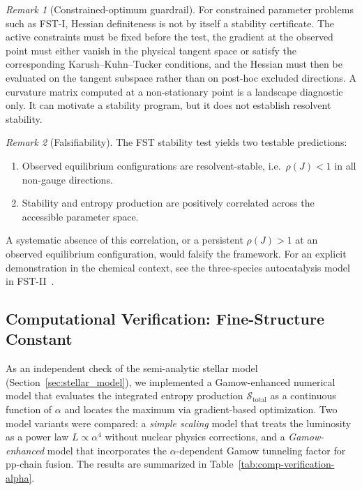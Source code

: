 \documentclass[12pt,a4paper]{article}
\theoremstyle{remark}
\newtheorem{remark}{Remark}
\begin{document}
\begin{remark}[Constrained-optimum guardrail]\label{rem:kkt-guardrail}
For constrained parameter problems such as FST-I, Hessian definiteness is not
by itself a stability certificate.  The active constraints must be fixed before
the test, the gradient at the observed point must either vanish in the physical
tangent space or satisfy the corresponding Karush--Kuhn--Tucker conditions, and
the Hessian must then be evaluated on the tangent subspace rather than on
post-hoc excluded directions.  A curvature matrix computed at a non-stationary
point is a landscape diagnostic only.  It can motivate a stability program, but
it does not establish resolvent stability.
\end{remark}

\begin{remark}[Falsifiability]\label{rem:falsifiability-protocol}
The FST stability test yields two testable predictions:
\begin{enumerate}[label=(\roman*)]
  \item Observed equilibrium configurations are resolvent-stable,
        i.e.\ $\rho(J) < 1$ in all non-gauge directions.
  \item Stability and entropy production are positively correlated across
        the accessible parameter space.
\end{enumerate}
A systematic absence of this correlation, or a persistent $\rho(J) > 1$
at an observed equilibrium configuration, would falsify the framework.
For an explicit demonstration in the chemical context, see the
three-species autocatalysis model in FST-II~\cite{FSTII}.
\end{remark}

\subsection{Computational Verification: Fine-Structure Constant}
\label{sec:comp-verification-alpha}

As an independent check of the semi-analytic stellar model (Section~\ref{sec:stellar_model}), we implemented a Gamow-enhanced numerical model that evaluates the integrated entropy production $\mathcal{S}_{\text{total}}$ as a continuous function of $\alpha$ and locates the maximum via gradient-based optimization. Two model variants were compared: a \emph{simple scaling} model that treats the luminosity as a power law $L \propto \alpha^4$ without nuclear physics corrections, and a \emph{Gamow-enhanced} model that incorporates the $\alpha$-dependent Gamow tunneling factor for pp-chain fusion. The results are summarized in Table~\ref{tab:comp-verification-alpha}.
\end{document}
